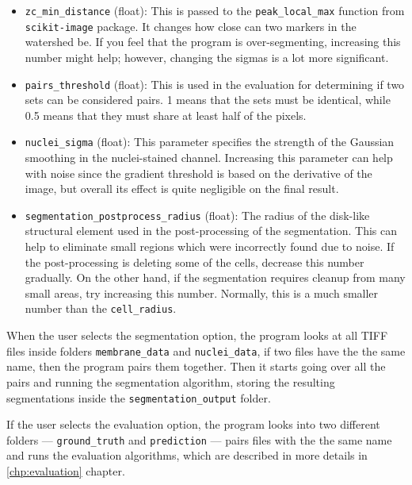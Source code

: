 \documentclass[
  digital,     %
  oneside,     %
  nosansbold,  %
  nocolorbold, %
  lof,         %
  lot,         %
]{fithesis4}
\begin{document}
\begin{itemize}
    \item \texttt{zc\_min\_distance} (float): This is passed to the
        \texttt{peak\_local\_max} function from \texttt{scikit-image} package.
        It changes how close can two markers in the watershed be. If you feel
        that the program is over-segmenting, increasing this number might help;
        however, changing the sigmas is a lot more significant.
    \item \texttt{pairs\_threshold} (float): This is used in the evaluation for
        determining if two sets can be considered pairs. 1 means that the sets
        must be identical, while 0.5 means that they must share at least half of
        the pixels.
    \item \texttt{nuclei\_sigma} (float): This parameter specifies the strength
        of the Gaussian smoothing in the nuclei-stained channel. Increasing this
        parameter can help with noise since the gradient threshold is based on the
        derivative of the image, but overall its effect is quite negligible on the
        final result.
    \item \texttt{segmentation\_postprocess\_radius} (float): The radius of the
        disk-like structural element used in the post-processing of the
        segmentation. This can help to eliminate small regions which were
        incorrectly found due to noise. If the post-processing is deleting some of 
        the cells, decrease this number gradually. On the other hand, if the segmentation
        requires cleanup from many small areas, try increasing this number. Normally,
        this is a much smaller number than the \texttt{cell\_radius}.
\end{itemize}

When the user selects the segmentation option, the program looks at all TIFF
files inside folders \texttt{membrane\_data} and \texttt{nuclei\_data}, if two files have the
the same name, then the program pairs them together. Then it starts going over all
the pairs and running the segmentation algorithm, storing the resulting
segmentations inside the \texttt{segmentation\_output} folder.

If the user selects the evaluation option, the program looks into two different
folders --- \texttt{ground\_truth} and \texttt{prediction} --- pairs files with the
the same name and runs the evaluation algorithms, which are described in more
details in \ref{chp:evaluation} chapter.
\end{document}
